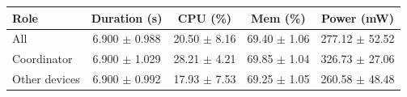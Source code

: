 \begin{tabular}{lcccc}
\hline
\textbf{Role} & \textbf{Duration (s)} & \textbf{CPU (\%)} & \textbf{Mem (\%)} & \textbf{Power (mW)} \\
\hline
All & 6.900 $\pm$ 0.988 & 20.50 $\pm$ 8.16 & 69.40 $\pm$ 1.06 & 277.12 $\pm$ 52.52 \\
Coordinator & 6.900 $\pm$ 1.029 & 28.21 $\pm$ 4.21 & 69.85 $\pm$ 1.04 & 326.73 $\pm$ 27.06 \\
Other devices & 6.900 $\pm$ 0.992 & 17.93 $\pm$ 7.53 & 69.25 $\pm$ 1.05 & 260.58 $\pm$ 48.48 \\
\hline
\end{tabular}
